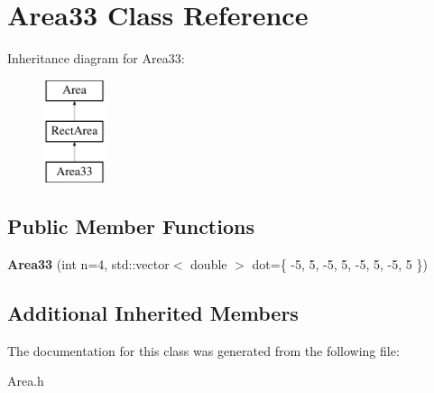 \hypertarget{class_area33}{}\section{Area33 Class Reference}
\label{class_area33}
Inheritance diagram for Area33\+:\begin{figure}[H]
\begin{center}
\leavevmode
\includegraphics[height=3.000000cm]{class_area33}
\end{center}
\end{figure}
\subsection*{Public Member Functions}
\begin{DoxyCompactItemize}
\item 
\mbox{\label{class_area33_a9e02db1a6fcdc9479f6b0c35bf6b6c67}} 
{\bfseries Area33} (int n=4, std\+::vector$<$ double $>$ dot=\{ -\/5, 5, -\/5, 5, -\/5, 5, -\/5, 5 \})
\end{DoxyCompactItemize}
\subsection*{Additional Inherited Members}


The documentation for this class was generated from the following file\+:\begin{DoxyCompactItemize}
\item 
Area.\+h\end{DoxyCompactItemize}

